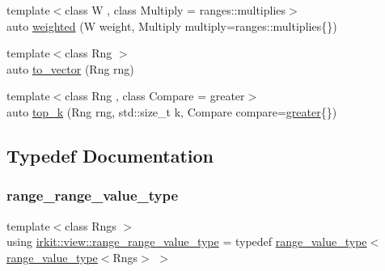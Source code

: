 \begin{DoxyCompactItemize}
\item 
{\footnotesize template$<$class W , class Multiply  = ranges\+::multiplies$>$ }\\auto \hyperlink{namespaceirkit_1_1view_ab3c27d862e946a966c4d7f004407499a}{weighted} (W weight, Multiply multiply=ranges\+::multiplies\{\})
\item 
{\footnotesize template$<$class Rng $>$ }\\auto \hyperlink{namespaceirkit_1_1view_a47e3af80728642c02c0204e1db2ecbd4}{to\+\_\+vector} (Rng rng)
\item 
{\footnotesize template$<$class Rng , class Compare  = greater$>$ }\\auto \hyperlink{namespaceirkit_1_1view_a94331e22539c88bf23e8d801c004fee2}{top\+\_\+k} (Rng rng, std\+::size\+\_\+t k, Compare compare=\hyperlink{structirkit_1_1view_1_1greater}{greater}\{\})
\end{DoxyCompactItemize}


\subsection{Typedef Documentation}
\mbox{\label{namespaceirkit_1_1view_ae24f427c615bdecfcded89b8f028fb6c}} 
\subsubsection{\texorpdfstring{range\+\_\+range\+\_\+value\+\_\+type}{range\_range\_value\_type}}
{\footnotesize\ttfamily template$<$class Rngs $>$ \\
using \hyperlink{namespaceirkit_1_1view_ae24f427c615bdecfcded89b8f028fb6c}{irkit\+::view\+::range\+\_\+range\+\_\+value\+\_\+type} = typedef \hyperlink{namespaceirkit_1_1view_aa01f8ad24d5b6600bc31631b56448817}{range\+\_\+value\+\_\+type}$<$\hyperlink{namespaceirkit_1_1view_aa01f8ad24d5b6600bc31631b56448817}{range\+\_\+value\+\_\+type}$<$Rngs$>$ $>$}

\mbox{\label{namespaceirkit_1_1view_aa01f8ad24d5b6600bc31631b56448817}} 
